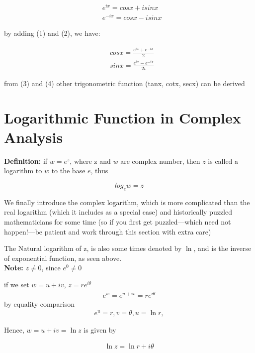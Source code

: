 \documentclass[12pt]{article}
\begin{document}
\begin{center}
    \begin{eqnarray}
       & e^{ix} = cosx + isinx \\
       & e^{-ix} = cosx - isinx
    \end{eqnarray}
\end{center}

by adding (1) and (2), we have:
\begin{center}
    \begin{eqnarray}
        &cos x = \frac{e^{ix}+ e^{-ix}}{2}\\
        &sin x = \frac{e^{ix}- e^{-ix}}{2i}
    \end{eqnarray}
\end{center}
from (3) and (4) other trigonometric function (tanx, cotx, secx) can be derived 
\section{Logarithmic Function in Complex Analysis}

\textbf{Definition:}
\newline
if $w = e^{z}$, where z and $w$ are complex number, then $z$ is called a logarithm to $w$ to the base $e$, thus

\[log_{e}w = z\]

We finally introduce the complex logarithm, which is more complicated than the real logarithm (which it includes as a special case) and historically puzzled mathematicians for some time (so if you first get puzzled—which need not happen!—be patient and work through this section with extra care)

The Natural logarithm of z, is also some times denoted by $\ln$, and is the inverse of exponential function, as seen above. \\
\textbf{Note:} $z \neq 0$, since $e^{0} \neq 0$

\begin{center}
    if we set $w= u+iv$, $z = re^{i\theta}$
    \begin{eqnarray}
        e^{w} = e^{u+iv} = re^{i\theta}
    \end{eqnarray}
    by equality comparison
    \begin{eqnarray}
        e^{u} = r , v = \theta, u = \ln r,
    \end{eqnarray}
\end{center}

Hence, $w = u + iv = \ln z$ is given by

\begin{center}
    \begin{eqnarray}
        \ln z = \ln r + i\theta
    \end{eqnarray}
\end{center}
\end{document}
